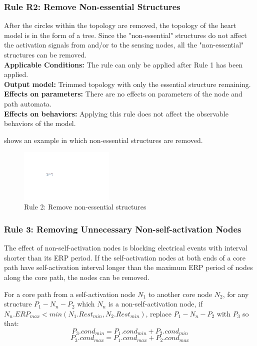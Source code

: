 \subsubsection{Rule R2: Remove Non-essential Structures}
After the circles within the topology are removed, the topology of the heart model is in the form of a tree. Since the "non-essential" structures do not affect the activation signals from and/or to the sensing nodes, all the "non-essential" structures can be removed.\\
\textbf{Applicable Conditions: }The rule can only be applied after Rule 1 has been applied.\\
\textbf{Output model: } Trimmed topology with only the essential structure remaining.\\
\textbf{Effects on parameters: } There are no effects on parameters of the node and path automata.\\
\textbf{Effects on behaviors: } Applying this rule does not affect the observable behaviors of the model.

 shows an example in which non-essential structures are removed.
\begin{figure}[!h]
	\centering
	\includegraphics[width=0.4\textwidth]{figs/rule2.pdf}
	\caption{\small Rule 2: Remove non-essential structures}
	\label{fig:rule2}
\end{figure}
\subsubsection{Rule 3: Removing Unnecessary Non-self-activation Nodes}
The effect of non-self-activation nodes is blocking electrical events with interval shorter than its ERP period. If the self-activation nodes at both ends of a core path have self-activation interval longer than the maximum ERP period of nodes along the core path, the nodes can be removed.

For a core path from a self-activation node $N_1$ to another core node $N_2$, for any structure $P_1-N_n-P_2$ which $N_n$ is a non-self-activation node, if $N_n.ERP_{max}<min(N_1.Rest_{min},N_2.Rest_{min})$, replace $P_1-N_n-P_2$ with $P_3$ so that:
$$P_3.cond_{min}=P_1.cond_{min}+P_2.cond_{min}$$
$$P_3.cond_{max}=P_1.cond_{max}+P_2.cond_{max}$$

